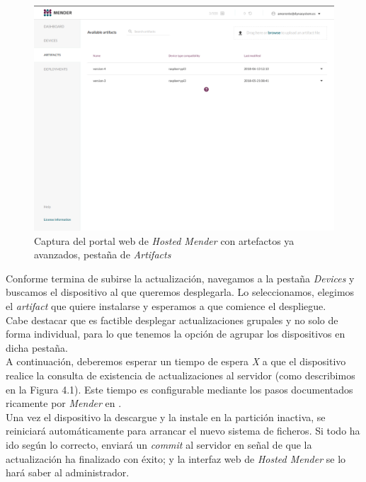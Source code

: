 \begin{figure}[H]
	\centering
	\includegraphics[width=\linewidth]{imagenes/captura-hosted-mender.png}
	\caption{Captura del portal web de \textit{Hosted Mender} con artefactos ya avanzados, pestaña de \textit{Artifacts}}
	\label{captura-hosted-mender}
\end{figure}

Conforme termina de subirse la actualización, navegamos a la pestaña \textit{Devices} y buscamos el dispositivo al que queremos desplegarla. Lo seleccionamos, elegimos el \textit{artifact} que quiere instalarse y esperamos a que comience el despliegue.\\

Cabe destacar que es factible desplegar actualizaciones grupales y no solo de forma individual, para lo que tenemos la opción de agrupar los dispositivos en dicha pestaña.\\

A continuación, deberemos esperar un tiempo de espera \textit{X} a que el dispositivo realice la consulta de existencia de actualizaciones al servidor (como describimos en la Figura 4.1). Este tiempo es configurable mediante los pasos documentados ricamente por \textit{Mender} en \cite{client-configuration}.\\

Una vez el dispositivo la descargue y la instale en la partición inactiva, se reiniciará automáticamente para arrancar el nuevo sistema de ficheros. Si todo ha ido según lo correcto, enviará un \textit{commit} al servidor en señal de que la actualización ha finalizado con éxito; y la interfaz web de \textit{Hosted Mender} se lo hará saber al administrador.\\

